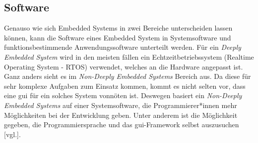 \subsection{Software}
\label{subsec:EmbeddedSoftware}
Genauso wie sich Embedded Systems in zwei Bereiche unterscheiden lassen können, kann die
Software eines Embedded System in Systemsoftware und funktionsbestimmende
Anwendungssoftware unterteilt werden.
Für ein \emph{Deeply Embedded System} wird in den meisten fällen ein Echtzeitbetriebssystem
(Realtime Operating System - RTOS) verwendet, welches an die Hardware angepasst ist.
\newline
\newline
Ganz anders sieht es im \emph{Non-Deeply Embedded Systems} Bereich aus. Da diese für sehr
komplexe Aufgaben zum Einsatz kommen, kommt es nicht selten
vor, dass eine \ac{gui} für ein solches System vonnöten ist. Deswegen basiert ein
\emph{Non-Deeply
Embedded Systems} auf einer Systemsoftware, die Programmierer*innen mehr Möglichkeiten bei
der Entwicklung geben. Unter anderem ist die Möglichkeit gegeben, die Programmiersprache
und
das \ac{gui}-Framework selbst auszusuchen \cite{EmbeddedLinuxQuade}[vgl.].